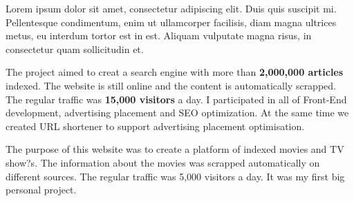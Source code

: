 \documentclass[letterpaper]{my-resume} %
\begin{document}
\begin{minipage}[t]{0.66\textwidth}

Lorem ipsum dolor sit amet, consectetur adipiscing elit. Duis quis suscipit mi. Pellentesque condimentum, enim ut ullamcorper facilisis, diam magna ultrices metus, eu interdum tortor est in est. Aliquam vulputate magna risus, in consectetur quam sollicitudin et.

\sectionspace %



The project aimed to creat a search engine with more than \textbf{2,000,000 articles} indexed. The website is still online and the content is automatically scrapped. The regular traffic was \textbf{15,000 visitors} a day. I participated in all of Front-End development, advertising placement and SEO optimization. At the same time we created URL shortener to support advertising placement optimisation.

\sectionspace %



The purpose of this website was to create a platform of indexed movies and TV show?s. The information about the movies was scrapped automatically on different sources. The regular traffic was 5,000 visitors a day. It was my first big personal project.

\sectionspace %

\end{minipage}
\end{document}
